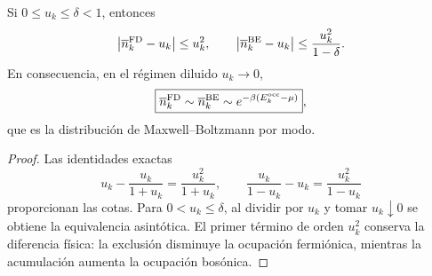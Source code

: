 \begin{theorem}
\label{thm:limite-clasico-fd-be-rev2}
Si \(0\leq u_k\leq\delta<1\), entonces
\[
 \left|\overline n_k^{\rm FD}-u_k\right|\leq u_k^2,
 \qquad
 \left|\overline n_k^{\rm BE}-u_k\right|
 \leq\frac{u_k^2}{1-\delta}.
\]
En consecuencia, en el régimen diluido \(u_k\to0\),
\[
 \boxed{
 \overline n_k^{\rm FD}\sim
 \overline n_k^{\rm BE}\sim
 e^{-\beta(E_k^{\rm occ}-\mu)}} ,
\]
que es la distribución de Maxwell--Boltzmann por modo.
\end{theorem}

\begin{proof}
Las identidades exactas
\[
 u_k-\frac{u_k}{1+u_k}=\frac{u_k^2}{1+u_k},
 \qquad
 \frac{u_k}{1-u_k}-u_k=\frac{u_k^2}{1-u_k}
\]
proporcionan las cotas. Para \(0<u_k\leq\delta\), al dividir por \(u_k\) y
tomar \(u_k\downarrow0\) se obtiene
la equivalencia asintótica. El primer término de orden \(u_k^2\) conserva la
diferencia física: la exclusión disminuye la ocupación fermiónica, mientras
la acumulación aumenta la ocupación bosónica.
\end{proof}
